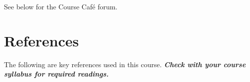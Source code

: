 \documentclass[
]{book}
\begin{document}
See below for the Course Café forum.

\hypertarget{references}{%
\chapter*{References}\label{references}}

The following are key references used in this course. \textbf{\emph{Check with your course syllabus for required readings.}}

  
\end{document}
